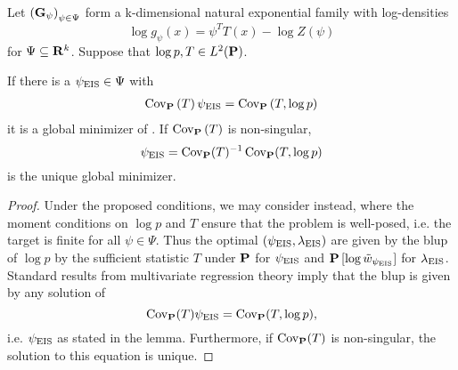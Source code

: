 \begin{lemma}
    \label{prop:eis_exponential_families}
    Let $\left( \G_{\psi} \right)_{\psi \in \Psi}$ form a k-dimensional natural exponential family with log-densities 
    $$
        \log g_{\psi}(x) = \psi^{T} T(x) - \log Z(\psi)
    $$
    for $\Psi \subseteq \R^{k}$. Suppose that $\log p, T \in L^{2}(\P)$. 

    If there is a $\peis \in \Psi$ with
    \begin{align}
        \label{eq:peis-analytical}
        \cov_{\P} \left( T \right)\peis = \cov_{\P} \left(T, \log p \right)
    \end{align}
    it is a global minimizer of . If $\cov_{\P} \left( T \right)$ is non-singular,
    $$
    \peis = \cov_{\P} (T) ^{-1} \cov _{\P} (T, \log p )
    $$
    is the unique global minimizer.
\end{lemma}

\begin{proof}
    Under the proposed conditions, we may consider  instead, where the moment conditions on $\log p $ and $T$ ensure that the problem is well-posed, i.e. the target is finite for all $\psi \in \Psi$. 
    Thus the optimal $ \left( \peis, \lambda_{\eis} \right)$ are given by the \gls{blup} of $\log p $ by the sufficient statistic $T$ under $\P$ for $\peis$ and $\P \left[ \log \tilde w_{\peis} \right]$ for $\lambda_{\eis}$. Standard results from multivariate regression theory imply that the \acrshort{blup} is given by any solution of
    $$
        \cov_{\P} (T) \peis = \cov_{\P} (T, \log p),
    $$
    i.e. $\peis$ as stated in the lemma. Furthermore, if $\cov_{\P} (T)$ is non-singular, the solution to this equation is unique.
    
\end{proof}

